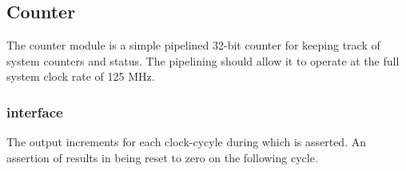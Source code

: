 \subsection{Counter}

The counter module is a simple pipelined 32-bit counter for keeping
track of system counters and status. The pipelining should allow it to operate at the full system clock rate of 125 MHz. 

\subsubsection{interface}
The  output increments for each clock-cycyle during which  is asserted. An assertion of  results in  being reset to zero on the following cycle. 

